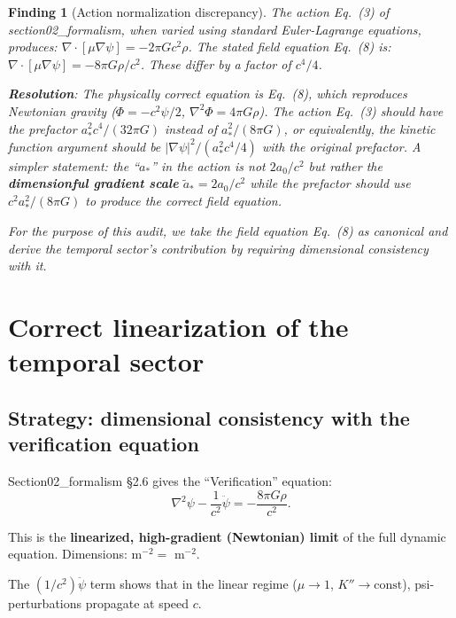\documentclass[11pt]{article}
\newtheorem{finding}{Finding}
\begin{document}
\begin{finding}[Action normalization discrepancy]
\label{find:normalization}
The action Eq.~(3) of section02\_formalism, when varied using
standard Euler-Lagrange equations, produces:
$\nabla\cdot[\mu\nabla\psi] = -2\pi G c^2 \rho$.
The stated field equation Eq.~(8) is:
$\nabla\cdot[\mu\nabla\psi] = -8\pi G\rho/c^2$.
These differ by a factor of $c^4/4$.

\textbf{Resolution}: The physically correct equation is Eq.~(8),
which reproduces Newtonian gravity ($\Phi = -c^2\psi/2$, $\nabla^2\Phi
= 4\pi G\rho$). The action Eq.~(3) should have the prefactor
$a_*^2 c^4/(32\pi G)$ instead of $a_*^2/(8\pi G)$, or equivalently,
the kinetic function argument should be $|\nabla\psi|^2/(a_*^2 c^4/4)$
with the original prefactor. A simpler statement: the ``$a_*$'' in
the action is not $2a_0/c^2$ but rather the \textbf{dimensionful
gradient scale} $\tilde{a}_* = 2a_0/c^2$ while the prefactor should
use $c^2 a_*^2/(8\pi G)$ to produce the correct field equation.

For the purpose of this audit, we take the field equation Eq.~(8) as
canonical and derive the temporal sector's contribution by requiring
dimensional consistency with it.
\end{finding}


\section{Correct linearization of the temporal sector}
\label{sec:correct-lin}

\subsection{Strategy: dimensional consistency with the verification equation}

Section02\_formalism \S2.6 gives the ``Verification'' equation:
\begin{equation}
\nabla^2\psi - \frac{1}{c^2}\ddot\psi = -\frac{8\pi G\rho}{c^2}.
\label{eq:verification}
\end{equation}

This is the \textbf{linearized, high-gradient (Newtonian) limit} of the
full dynamic equation. Dimensions: m$^{-2} = $ m$^{-2}$. \checkmark

The $(1/c^2)\ddot\psi$ term shows that in the linear regime ($\mu \to 1$,
$K'' \to \text{const}$), psi-perturbations propagate at speed $c$.
\end{document}
